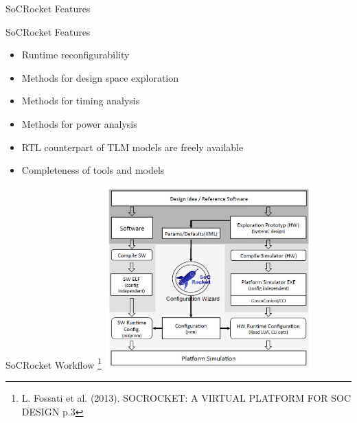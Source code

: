 \begin{frame}{SoCRocket Features}
    \begin{block}{SoCRocket Features}
        \begin{itemize}
         \item Runtime reconfigurability
         \item Methods for design space exploration
         \item Methods for timing analysis
         \item Methods for power analysis
         \item RTL counterpart of TLM models are freely available
         \item Completeness of tools and models
        \end{itemize}
    \end{block}
\end{frame}

\begin{frame}{SoCRocket Workflow \footnote{L. Fossati et al. (2013). SOCROCKET: A VIRTUAL PLATFORM FOR SOC DESIGN p.3}}
    \centering
    \includegraphics[height=7cm]{pictures/SoCRocket_workflow.JPG}
\end{frame}
